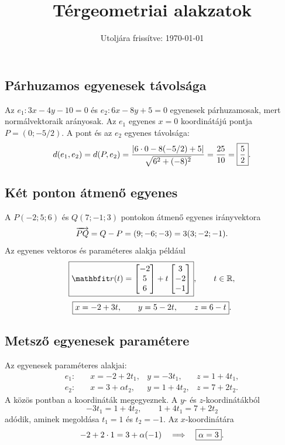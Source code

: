\documentclass{szb-solution}
\title{Térgeometriai alakzatok}
\date{Utoljára frissítve: \today}
\begin{document}
\maketitle

\subsection{Párhuzamos egyenesek távolsága}

Az $e_1:3x-4y-10=0$ és $e_2:6x-8y+5=0$ egyenesek párhuzamosak,
mert normálvektoraik arányosak. Az $e_1$ egyenes $x=0$ koordinátájú pontja
$P=(0;-5/2)$. A pont és az $e_2$ egyenes távolsága:
$$
  d(e_1,e_2)
  =d(P,e_2)
  =\frac{|6\cdot0-8(-5/2)+5|}{\sqrt{6^2+(-8)^2}}
  =\frac{25}{10}
  =\boxed{\frac52}
  \text.
$$

\subsection{Két ponton átmenő egyenes}

A $P(-2;5;6)$ és $Q(7;-1;3)$ pontokon átmenő egyenes irányvektora
$$
  \overrightarrow{PQ}=Q-P=(9;-6;-3)=3(3;-2;-1)
  \text.
$$
Az egyenes vektoros és paraméteres alakja például
$$
  \boxed{
    \rvec r(t)=
    \begin{bmatrix}-2\\5\\6\end{bmatrix}
    +t\begin{bmatrix}3\\-2\\-1\end{bmatrix}
  },
  \qquad t\in\Reals,
$$
$$
  \boxed{
    x=-2+3t,
    \qquad y=5-2t,
    \qquad z=6-t
  }
  \text.
$$

\subsection{Metsző egyenesek paramétere}

Az egyenesek paraméteres alakjai:
$$
  \begin{aligned}
    e_1:&\quad x=-2+2t_1, & y=-3t_1, & z=1+4t_1,\\
    e_2:&\quad x=3+\alpha t_2, & y=1+4t_2, & z=7+2t_2.
  \end{aligned}
$$
A közös pontban a koordináták megegyeznek. A $y$- és $z$-koordinátákból
$$
  -3t_1=1+4t_2,
  \qquad
  1+4t_1=7+2t_2
$$
adódik, aminek megoldása $t_1=1$ és $t_2=-1$. Az $x$-koordinátára
$$
  -2+2\cdot1=3+\alpha(-1)
  \quad\Longrightarrow\quad
  \boxed{\alpha=3}
  \text.
$$
\end{document}
